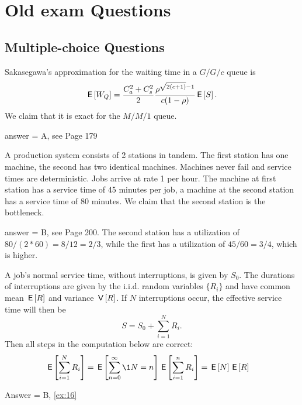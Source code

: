 \section{Old exam Questions}

\subsection{Multiple-choice Questions}

\begin{exercise}[201807]{1}
Sakasegawa's approximation for the waiting time in a $G/G/c$ queue is 
\begin{equation*}
  \,\mathsf{E}\left[W_Q\right] = \frac{C_a^2+C_s^2}2 \frac{\rho^{\sqrt{2(c+1)}-1}}{c(1-\rho)} \,\mathsf{E}\left[S\right].
\end{equation*}
We claim that it is exact for the $M/M/1$ queue.
\begin{solution}
answer = A, see Page 179
\end{solution}
\end{exercise}

\begin{exercise}[201807]{1}
  A production system consists of 2 stations in tandem. The first station has one machine, the second has two identical machines. Machines never fail and service times are deterministic. Jobs arrive at rate 1 per hour. The machine at first station has a service time of 45 minutes per job, a machine at the second station has a service time of 80 minutes. We claim that the second  station is the bottleneck. 
\begin{solution}
answer = B, see Page 200. The second station has a utilization of $80/(2*60) = 8/12 = 2/3$, while  the first has a utilization of $45/60 = 3/4$, which is higher.
\end{solution}
\end{exercise}


\begin{exercise}[201904, 1]
  A job's normal service time, without interruptions, is given by $S_0$.
  The durations of interruptions are given by the i.i.d.
  random variables $\{R_i\}$ and have common mean $\,\mathsf{E}\left[R\right]$ and variance $\,\mathsf{V}\left[R\right]$.
  If $N$ interruptions occur, the effective service time will then be
\begin{equation*}
S= S_0 + \sum_{i=1}^N R_i.
\end{equation*}
Then all steps in the computation below are correct: 
\begin{align*}
  \E{\sum_{i=1}^N R_i} 
&=  \E{ \sum_{n=0}^\infty \1{N=n}} \E{ \sum_{i=1}^n R_i } = \E N \E R
\end{align*}
\begin{solution} Answer = B, \ref{ex:16}
\end{solution}
\end{exercise}

